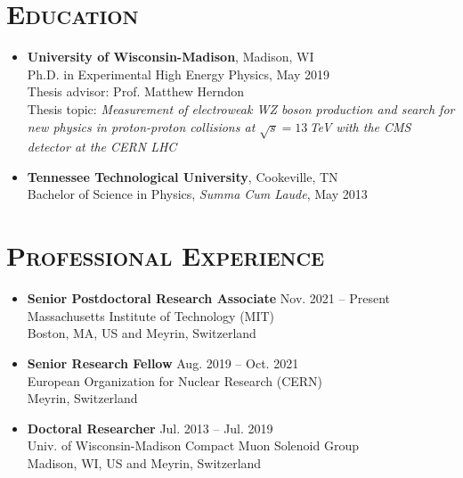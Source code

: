 \documentclass[10pt]{res} %
\begin{document}

\address{\textbf{Current Address} \\  CERN B40/2-A20 \\  Geneva 23 \\ Switzerland \\ Tel: +41 77 501 95 13 }
\address{}

\begin{resume}
\section{\textsc{Education}}
\begin{itemize}
    \item \textbf{University of Wisconsin-Madison}, Madison, WI \\
Ph.D. in Experimental High Energy Physics, May 2019 \\
  Thesis advisor: Prof. Matthew Herndon \\
    Thesis topic: \emph{Measurement of electroweak WZ boson production and search for new physics in proton-proton collisions at $\sqrt{s}=13$\,TeV with the CMS detector at the CERN LHC}
    \item \textbf{Tennessee Technological University}, Cookeville, TN \\
Bachelor of Science in Physics, \textit{Summa Cum Laude}, May 2013
\end{itemize}

\section{\textsc{Professional Experience}}
\begin{itemize}
  \item \textbf{Senior Postdoctoral Research Associate} \hfill{Nov. 2021 -- Present} \\
Massachusetts Institute of Technology (MIT)   \\  Boston, MA, US and Meyrin, Switzerland
  \item \textbf{Senior Research Fellow} \hfill{Aug. 2019 -- Oct. 2021} \\
European Organization for Nuclear Research (CERN)   \\  Meyrin, Switzerland
  \item \textbf{Doctoral Researcher} \hfill{Jul. 2013 -- Jul. 2019} \\
Univ. of Wisconsin-Madison Compact Muon Solenoid Group \\  Madison, WI, US and Meyrin, Switzerland
\end{itemize}


\end{resume}
\end{document}

